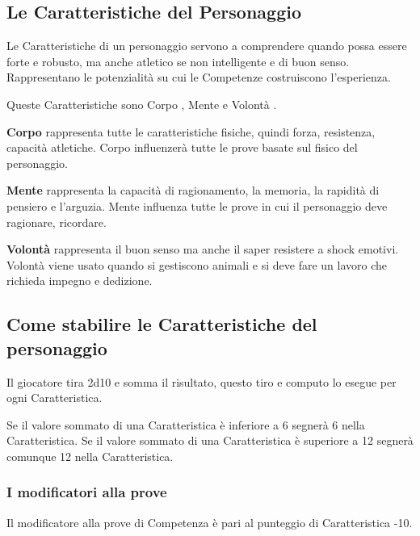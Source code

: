 \documentclass[12pt,a4paper,twoside,openany]{book}
\begin{document}
\begin{multicols}{2}

\subsection{Le Caratteristiche del Personaggio}

Le Caratteristiche di un personaggio servono a comprendere quando possa essere forte e robusto, ma anche atletico se non intelligente e di buon senso. Rappresentano le potenzialità su cui le Competenze costruiscono l'esperienza.

Queste Caratteristiche sono Corpo , Mente  e Volontà .

\textbf{Corpo} rappresenta tutte le caratteristiche fisiche, quindi forza, resistenza, capacità atletiche. Corpo influenzerà tutte le prove basate sul fisico del personaggio.

\textbf{Mente} rappresenta la capacità di ragionamento, la memoria, la rapidità di pensiero e l'arguzia. Mente influenza tutte le prove in cui il personaggio deve ragionare, ricordare.

\textbf{Volontà} rappresenta il buon senso ma anche il saper resistere a shock emotivi. Volontà viene usato quando si gestiscono animali e si deve fare un lavoro che richieda impegno e dedizione.

\subsection{Come stabilire le Caratteristiche del personaggio}

Il giocatore tira 2d10 e somma il risultato, questo tiro e computo lo esegue per ogni Caratteristica.

Se il valore sommato di una Caratteristica è inferiore a 6 segnerà 6 nella Caratteristica. Se il valore sommato di una Caratteristica è superiore a 12 segnerà comunque 12 nella Caratteristica.

\subsubsection{I modificatori alla prove}

Il modificatore alla prove di Competenza è pari al punteggio di Caratteristica -10.

\end{multicols}
\end{document}
